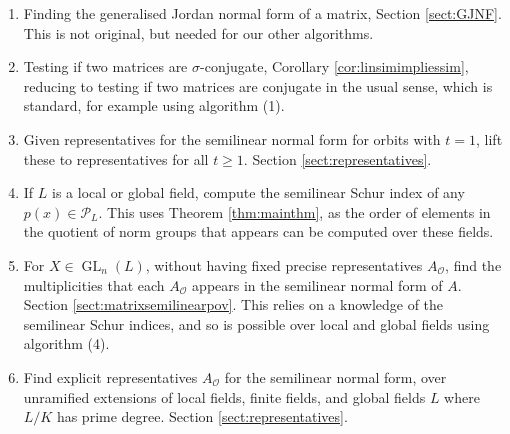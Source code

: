 \documentclass[10pt, reqno, hidelinks]{amsart}
\newcommand{\OO}{\mathcal{O}}
\DeclareMathOperator{\GL}{GL}
\newcommand{\sP}{{\mathcal P}}
\numberwithin{thm}{subsection}
\theoremstyle{definition}
\begin{document}
\begin{enumerate}
	\item Finding the generalised Jordan normal form of a matrix, Section \ref{sect:GJNF}. This is not original, but needed for our other algorithms.
	\item Testing if two matrices are $\sigma$-conjugate, Corollary \ref{cor:linsimimpliessim}, reducing to testing if two matrices are conjugate in the usual sense, which is standard, for example using algorithm (1).
	\item Given representatives for the semilinear normal form for orbits with $t = 1$, lift these to representatives for all $t \geq 1$. Section \ref{sect:representatives}.
	\item If $L$ is a local or global field, compute the semilinear Schur index of any $p(x) \in \sP_L$. This uses Theorem \ref{thm:mainthm}, as the order of elements in the quotient of norm groups that appears can be computed over these fields.
	\item For $X \in \GL_n(L)$, without having fixed precise representatives $A_{\OO}$, find the multiplicities that each $A_{\OO}$ appears in the semilinear normal form of $A$. Section \ref{sect:matrixsemilinearpov}. This relies on a knowledge of the semilinear Schur indices, and so is possible over local and global fields using algorithm (4).
	\item Find explicit representatives $A_{\OO}$ for the semilinear normal form, over unramified extensions of local fields, finite fields, and global fields $L$ where $L/K$ has prime degree. Section \ref{sect:representatives}.
\end{enumerate}

{}

\end{document}
